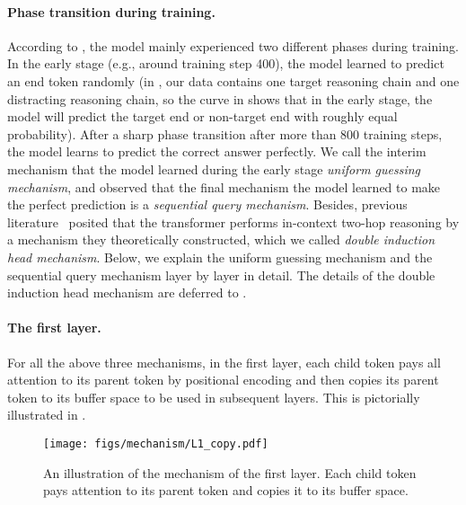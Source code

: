 \paragraph{Phase transition during training.} According to , the model mainly experienced two different phases during training. In the early stage (e.g., around training step 400), the model learned to predict an end token randomly (in , our data contains one target reasoning chain and one distracting reasoning chain, so the curve in  shows that in the early stage, the model will predict the target end or non-target end with roughly equal probability). After a sharp phase transition after more than 800 training steps, the model learns to predict the correct answer perfectly. We call the interim mechanism that the model learned during the early stage \emph{uniform guessing mechanism}, and observed that the final mechanism the model learned to make the perfect prediction is a \emph{sequential query mechanism}. Besides, previous literature~\citep{sanford2024transformers} posited that the transformer performs in-context two-hop reasoning by a mechanism they theoretically constructed, which we called \emph{double induction head mechanism}. Below, we explain the uniform guessing mechanism and the sequential query mechanism layer by layer in detail. The details of the double induction head mechanism are deferred to .

\paragraph{The first layer.} For all the above three mechanisms, in the first layer, each child token pays all attention to its parent token by positional encoding and then copies its parent token to its buffer space to be used in subsequent layers. This is pictorially illustrated in .

\begin{figure}[h]
    \centering
    \texttt{[image: figs/mechanism/L1\_copy.pdf]}
    \caption{An illustration of the mechanism of the first layer. Each child token pays attention to its parent token and copies it to its buffer space.}
    \label{fig:mech:L1_copy}
\end{figure}

